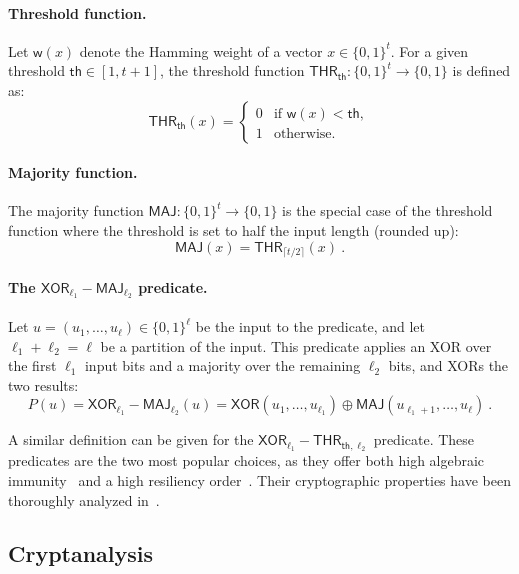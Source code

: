 \paragraph{Threshold function.} Let $\mathsf{w}(x)$ denote the Hamming weight of a vector $x \in \{0,1\}^t$. For a given threshold $\mathsf{th} \in [1, t+1]$, the threshold function $\mathsf{THR}_{\mathsf{th}} : \{0,1\}^t \to \{0,1\}$ is defined as:
$$
\mathsf{THR}_{\mathsf{th}}(x) = 
\begin{cases}
0 & \text{if } \mathsf{w}(x) < \mathsf{th}, \\
1 & \text{otherwise}.
\end{cases}
$$

\paragraph{Majority function.} The majority function $\mathsf{MAJ} : \{0,1\}^t \to \{0,1\}$ is the special case of the threshold function where the threshold is set to half the input length (rounded up):
$$
\mathsf{MAJ}(x) = \mathsf{THR}_{\lceil t/2 \rceil}(x)~.
$$



\paragraph{The $\mathsf{XOR}_{\ell_1}-\mathsf{MAJ}_{\ell_2}$ predicate.} Let $u = (u_1, \ldots, u_\ell) \in \{0,1\}^\ell$ be the input to the predicate, and let $\ell_1 + \ell_2 = \ell$ be a partition of the input. This predicate applies an XOR over the first $\ell_1$ input bits and a majority over the remaining $\ell_2$ bits, and XORs the two results:
$$
P(u) = \mathsf{XOR}_{\ell_1}-\mathsf{MAJ}_{\ell_2}(u) = \mathsf{XOR}(u_1, \ldots, u_{\ell_1}) \oplus \mathsf{MAJ}(u_{\ell_1+1}, \ldots, u_\ell)~.
$$

A similar definition can be given for the $\mathsf{XOR}_{\ell_1}-\mathsf{THR}_{\mathsf{th},\ell_2}$ predicate. These predicates are the two most popular choices, as they offer both high algebraic immunity~\cite{C:Courtois03,EC:CouMei03} and a high resiliency order~\cite{DBLP:journals/tit/Siegenthaler84}. Their cryptographic properties have been thoroughly analyzed in~\cite{DBLP:journals/ccds/Meaux21,DBLP:journals/dam/Meaux22}.  

\subsection{Cryptanalysis}


